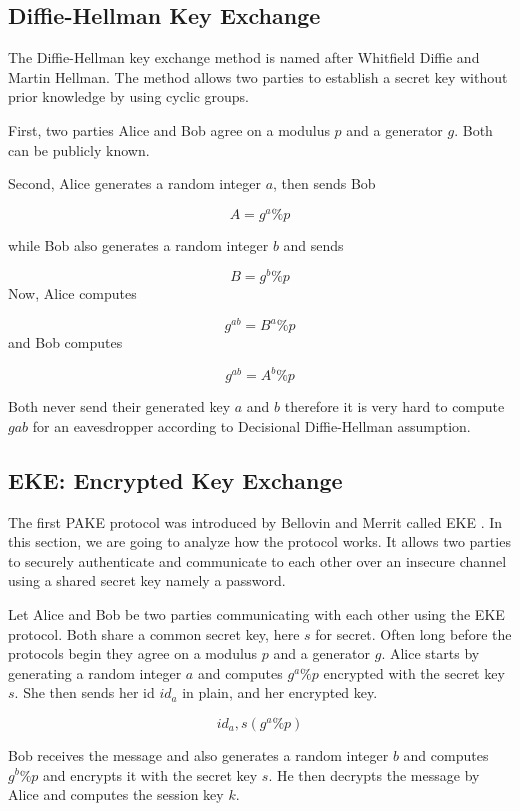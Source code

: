 \documentclass[../main.tex]{subfiles}
\begin{document}
\subsection{Diffie-Hellman Key Exchange}
The Diffie-Hellman key exchange method is named after Whitfield Diffie and Martin Hellman.
The method allows two parties to establish a secret key without prior knowledge by using
cyclic groups.

First, two parties Alice and Bob agree on a modulus \(p\) and a generator
\(g\). Both can be publicly known.

Second, Alice generates a random integer \(a\), then sends Bob 

\[A = g^a \% p\]

while Bob also generates a random integer \(b\) and sends

\[B = g^b \% p\]
Now, Alice computes

\[g^{ab} = B^a \% p\]
and Bob computes

\[g^{ab} = A^b \% p\]

Both never send their generated key \(a\) and \(b\) therefore it is very hard
to compute \(g{ab}\) for an eavesdropper according to Decisional
Diffie-Hellman assumption. 

\subsection{EKE: Encrypted Key Exchange}
The first PAKE protocol was introduced by Bellovin and Merrit called EKE
\cite{bellovin1992encrypted}. In this section, we are going to analyze how the
protocol works. It allows two parties to securely authenticate and communicate
to each other over an insecure channel using a shared secret key namely a
password.

Let Alice and Bob be two parties communicating with each other using the EKE
protocol. Both share a common secret key, here \(s\) for secret. Often long
before the protocols begin they agree on a modulus \(p\) and a generator
\(g\). Alice starts by generating a random integer \(a\) and computes \(g^a \%
p\) encrypted with the secret key \(s\). She then sends her id \(id_a\) in
plain, and her encrypted key.

\[id_a, s(g^a \% p)\]

Bob receives the message and also generates a random integer \(b\) and computes
\(g^b \% p\) and encrypts it with the secret key \(s\). He then decrypts the
message by Alice and computes the session key \(k\).
\end{document}
